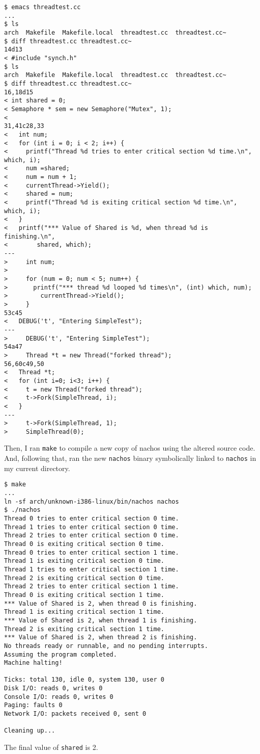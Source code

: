 \documentclass[11pt]{article}
\begin{document}
\begin{question}
\begin{itemize}
{        \begin{verbatim}
$ emacs threadtest.cc
...
$ ls
arch  Makefile  Makefile.local  threadtest.cc  threadtest.cc~
$ diff threadtest.cc threadtest.cc~
14d13
< #include "synch.h"
$ ls
arch  Makefile  Makefile.local  threadtest.cc  threadtest.cc~
$ diff threadtest.cc threadtest.cc~
16,18d15
< int shared = 0;
< Semaphore * sem = new Semaphore("Mutex", 1);
<
31,41c28,33
<   int num;
<   for (int i = 0; i < 2; i++) {
<     printf("Thread %d tries to enter critical section %d time.\n", which, i);
<     num =shared;
<     num = num + 1;
<     currentThread->Yield();
<     shared = num;
<     printf("Thread %d is exiting critical section %d time.\n", which, i);
<   }
<   printf("*** Value of Shared is %d, when thread %d is finishing.\n",
<        shared, which);
---
>     int num;
>
>     for (num = 0; num < 5; num++) {
>       printf("*** thread %d looped %d times\n", (int) which, num);
>         currentThread->Yield();
>     }
53c45
<   DEBUG('t', "Entering SimpleTest");
---
>     DEBUG('t', "Entering SimpleTest");
54a47
>     Thread *t = new Thread("forked thread");
56,60c49,50
<   Thread *t;
<   for (int i=0; i<3; i++) {
<     t = new Thread("forked thread");
<     t->Fork(SimpleThread, i);
<   }
---
>     t->Fork(SimpleThread, 1);
>     SimpleThread(0);
        \end{verbatim}

        Then, I ran {\tt make} to compile a new copy of nachos using the altered source code. And, following that, ran the new {\tt nachos} binary symbolically linked to {\tt nachos} in my current directory.

        \begin{verbatim}
$ make
...
ln -sf arch/unknown-i386-linux/bin/nachos nachos
$ ./nachos
Thread 0 tries to enter critical section 0 time.
Thread 1 tries to enter critical section 0 time.
Thread 2 tries to enter critical section 0 time.
Thread 0 is exiting critical section 0 time.
Thread 0 tries to enter critical section 1 time.
Thread 1 is exiting critical section 0 time.
Thread 1 tries to enter critical section 1 time.
Thread 2 is exiting critical section 0 time.
Thread 2 tries to enter critical section 1 time.
Thread 0 is exiting critical section 1 time.
*** Value of Shared is 2, when thread 0 is finishing.
Thread 1 is exiting critical section 1 time.
*** Value of Shared is 2, when thread 1 is finishing.
Thread 2 is exiting critical section 1 time.
*** Value of Shared is 2, when thread 2 is finishing.
No threads ready or runnable, and no pending interrupts.
Assuming the program completed.
Machine halting!

Ticks: total 130, idle 0, system 130, user 0
Disk I/O: reads 0, writes 0
Console I/O: reads 0, writes 0
Paging: faults 0
Network I/O: packets received 0, sent 0

Cleaning up...
        \end{verbatim}

        The final value of {\tt shared} is 2.

        }
        \end{itemize}

    \end{question}
\end{document}
